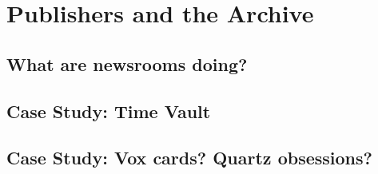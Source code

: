 \chapter{Publishers and the Archive}


\section{What are newsrooms doing?}

\section{Case Study: Time Vault}

\section{Case Study: Vox cards? Quartz obsessions?}